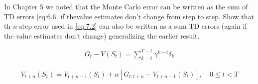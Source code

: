 
\begin{exercise}[Exercise 7.1]

In Chapter 5 we noted that the Monte Carlo error can be written as the sum of TD errors \eqref{eq:6.6} if thevalue estimates don't change from step to step.
Show that th $n$-step error used in \eqref{eq:7.2} can also be written as a sum TD errors (again if the value estimates don't change) generalizing the earlier result.

\begin{align} \label{eq:6.6} \tag{6.6}
    G_t - V(S_t)
    =
    \sum_{k=t}^{T-1}
        \gamma^{k-t}
        \delta_k
\end{align}

\begin{align} \label{eq:7.2} \tag{7.2}
    V_{t+n}(S_t)
    \doteq
    V_{t+n-1}(S_t) + \alpha [G_{t:t+n} - V_{t+n-1}(S_t)],
    \quad
    0 \leq t < T
\end{align}

\end{exercise}


\begin{solution}

\phantom{}

\end{solution}

